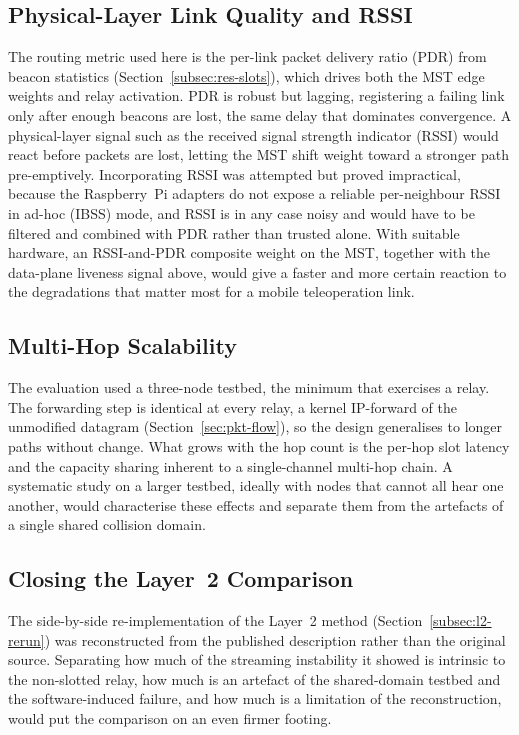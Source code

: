\subsection{Physical-Layer Link Quality and RSSI}
\label{subsec:fw-rssi}

The routing metric used here is the per-link packet delivery ratio (PDR) from
beacon statistics (Section~\ref{subsec:res-slots}), which drives both the MST edge
weights and relay activation. PDR is robust but lagging, registering a failing
link only after enough beacons are lost, the same delay that dominates
convergence. A physical-layer signal such as the received signal strength
indicator (RSSI) would react before packets are lost, letting the MST shift weight
toward a stronger path pre-emptively. Incorporating RSSI was attempted but proved
impractical, because the Raspberry~Pi adapters do not expose a reliable
per-neighbour RSSI in ad-hoc (IBSS) mode, and RSSI is in any case noisy and would
have to be filtered and combined with PDR rather than trusted alone. With suitable
hardware, an RSSI-and-PDR composite weight on the MST, together with the
data-plane liveness signal above, would give a faster and more certain reaction to
the degradations that matter most for a mobile teleoperation link.

\subsection{Multi-Hop Scalability}
\label{subsec:fw-multihop}

The evaluation used a three-node testbed, the minimum that exercises a relay. The
forwarding step is identical at every relay, a kernel IP-forward of the unmodified
datagram (Section~\ref{sec:pkt-flow}), so the design generalises to longer paths
without change. What grows with the hop count is the per-hop slot latency and the
capacity sharing inherent to a single-channel multi-hop chain. A systematic study
on a larger testbed, ideally with nodes that cannot all hear one another, would
characterise these effects and separate them from the artefacts of a single
shared collision domain.

\subsection{Closing the Layer~2 Comparison}
\label{subsec:fw-l2}

The side-by-side re-implementation of the Layer~2 method
(Section~\ref{subsec:l2-rerun}) was reconstructed from the published description
rather than the original source. Separating how much of the streaming instability
it showed is intrinsic to the non-slotted relay, how much is an artefact of the
shared-domain testbed and the software-induced failure, and how much is a
limitation of the reconstruction, would put the comparison on an even firmer
footing.
